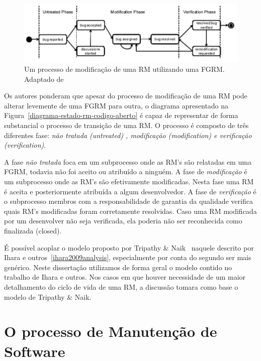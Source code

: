 \begin{figure}[htpb]
	\centering
	\includegraphics[width=0.8\linewidth]{./chapter-manutencao-software-visao-geral/img/diagrama-estado-rm-codigo-aberto.pdf}
	\caption{Um processo de modificação de uma RM utilizando uma FGRM. Adaptado
	de~\cite{ihara2009analysis}}
	\label{fig:diagrama-estado-rm-codigo-aberto}
\end{figure}

Os autores ponderam que apesar do processo de modificação de uma RM pode alterar
levemente de uma FGRM para outra, o diagrama apresentado na
Figura~\ref{diagrama-estado-rm-codigo-aberto} é capaz de representar de forma
substancial o processo de transição de uma RM. O processo é composto de três
diferentes fase: \textit{não tratada (untreated) , modificação (modification) e
verificação (verification)}.

A fase \textit{não tratada} foca em um subprocesso onde as RM's são relatadas em
uma FGRM, todavia não foi aceito ou atribuído a ninguém. A fase de
\textit{modificação} é um subprocesso onde as RM's são efetivamente modificadas.
Nesta fase uma RM é aceita e posteriormente atribuída a algum desenvolvedor.  A
fase de \textit{verificação} é o subprocesso membros com a responsabilidade de
garantia da qualidade verifica quais RM's modificadas foram corretamente
resolvidas. Caso uma RM modificada por um desenvolver não seja verificada, ela
poderia não ser reconhecida como finalizada (closed).

É possível acoplar o modelo proposto por Tripathy \&
Naik~\cite{tripathy2014software} naquele descrito por Ihara e
outros~\ref{ihara2009analysis}, especialmente por conta do segundo ser mais
genérico.  Neste dissertação utilizamos de forma geral o modelo contido no
trabalho de Ihara e outros. Nos casos em que houver necessidade de um maior
detalhamento do ciclo de vida de uma RM, a discussão tomara como base o modelo
de Tripathy \& Naik.
\todoend

\section{O processo de Manutenção de Software}
\label{sec:o_processo_de_manutecao_de_software}

